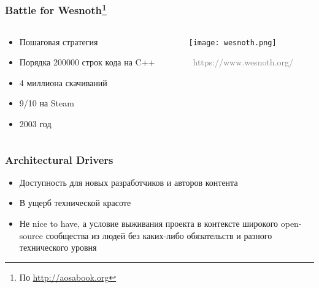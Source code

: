 \documentclass[xetex,mathserif,serif]{beamer}
\newcommand{\attribution}[1] {
    \vspace{-5mm}\begin{flushright}\begin{scriptsize}\textcolor{gray}{\textcopyright\, #1}\end{scriptsize}\end{flushright}
}
\begin{document}
    \begin{frame}
        \frametitle{Battle for Wesnoth\footnote{\tiny{По \url{http://aosabook.org}}}}
        \begin{columns}
            \begin{column}{0.4\textwidth}
                \begin{itemize}
                    \item Пошаговая стратегия
                    \item Порядка 200000 строк кода на C++
                    \item 4 миллиона скачиваний
                    \item 9/10 на Steam
                    \item 2003 год
                \end{itemize}
            \end{column}
            \begin{column}{0.6\textwidth}
                \texttt{[image: wesnoth.png]}
                \attribution{https://www.wesnoth.org/}
            \end{column}
        \end{columns}
    \end{frame}

    \begin{frame}
        \frametitle{Architectural Drivers}
        \begin{itemize}
            \item Доступность для новых разработчиков и авторов контента
            \item В ущерб технической красоте
            \item Не nice to have, а условие выживания проекта в контексте широкого open-source сообщества из людей без каких-либо обязательств и разного технического уровня
        \end{itemize}
    \end{frame}
\end{document}
